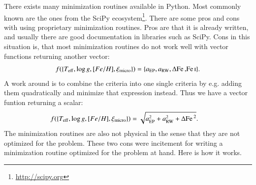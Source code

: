 \documentclass{aa}
\begin{document}
There exists many minimization routines available in Python. Most commonly
known are the ones from the SciPy ecosystem\footnote{\url{http://scipy.org}}.
There are some pros and cons with using proprietary minimization routines.
Pros are that it is already written, and usually there are good documentation
in libraries such as SciPy. Cons in this situation is, that most minimization
routines do not work well with vector functions returning another vector:
\begin{align}
    f(\{T_\mathrm{eff}, \log g, [Fe/H], \xi_\mathrm{micro}\}) = \{a_\mathrm{EP}, a_\mathrm{RW}, \Delta\ion{Fe}, \ion{Fe}{I}\}.
\end{align}
A work around is
to combine the criteria into one single criteria by e.g. adding them
quadratically and minimize that expression instead. Thus we have a vector
funtion returning a scalar:
\begin{align}
    f(\{T_\mathrm{eff}, \log g, [Fe/H], \xi_\mathrm{micro}\}) &= \sqrt{a_\mathrm{EP}^2 + a_\mathrm{RW}^2 + \Delta\ion{Fe}{}^2}.
\end{align}
The minimization routines
are also not physical in the sense that they are not optimized for the problem.
These two cons were incitement for writing a minimization routine optimized for the
problem at hand. Here is how it works.
\end{document}
